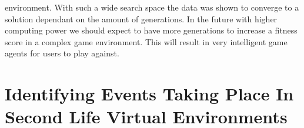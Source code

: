 \documentclass[12pt]{article} %
\begin{document}
environment. With such a wide search space the data was shown to converge to a solution dependant on the amount of generations. In the future with higher computing power we should expect  to have more generations to increase a fitness score in a complex game environment. This will result in very intelligent game agents for users to play against. 

\section{Identifying Events Taking Place In Second Life Virtual Environments} %
\end{document}
